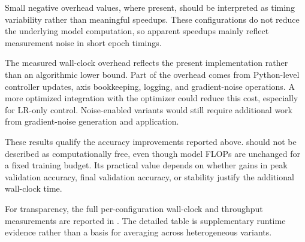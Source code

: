 Small negative overhead values, where present, should be interpreted as timing variability rather than meaningful speedups. These configurations do not reduce the underlying model computation, so apparent speedups mainly reflect measurement noise in short epoch timings.

The measured wall-clock overhead reflects the present implementation rather than an algorithmic lower bound. Part of the overhead comes from Python-level controller updates, axis bookkeeping, logging, and gradient-noise operations. A more optimized integration with the optimizer could reduce this cost, especially for LR-only control. Noise-enabled variants would still require additional work from gradient-noise generation and application.

These results qualify the accuracy improvements reported above. \method{} should not be described as computationally free, even though model FLOPs are unchanged for a fixed training budget. Its practical value depends on whether gains in peak validation accuracy, final validation accuracy, or stability justify the additional wall-clock time.

For transparency, the full per-configuration wall-clock and throughput measurements are reported in . The detailed table is supplementary runtime evidence rather than a basis for averaging across heterogeneous \method{} variants.